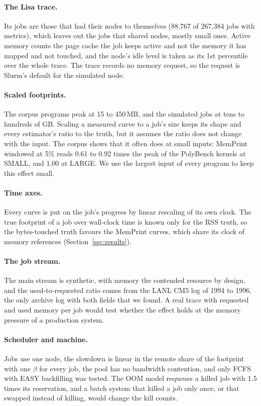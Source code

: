 \documentclass[11pt]{article}
\newcommand{\memprint}{MemPrint}
\newcommand{\secref}[1]{Section~\ref{#1}}
\begin{document}
\paragraph{The Lisa trace.} Its jobs are those that had their nodes to themselves (88{,}767 of 267{,}384 jobs with
metrics), which leaves out the jobs that shared nodes, mostly small ones. Active memory counts the page cache the
job keeps active and not the memory it has mapped and not touched, and the node's idle level is taken as its 1st
percentile over the whole trace. The trace records no memory request, so the request is Slurm's default for the
simulated node.

\paragraph{Scaled footprints.} The corpus programs peak at 15 to 450\,MB, and the simulated jobs at tens to
hundreds of GB. Scaling a measured curve to a job's size keeps its shape and every estimator's ratio to the
truth, but it assumes the ratio does not change with the input. The corpus shows that it often does at small
inputs: \memprint{} windowed at 5\% reads 0.61 to 0.92 times the peak of the PolyBench kernels at SMALL, and 1.00
at LARGE. We use the largest input of every program to keep this effect small.

\paragraph{Time axes.} Every curve is put on the job's progress by linear rescaling of its own clock. The true
footprint of a job over wall-clock time is known only for the RSS truth, so the bytes-touched truth favours the
\memprint{} curves, which share its clock of memory references (\secref{sec:results}).

\paragraph{The job stream.} The main stream is synthetic, with memory the contended resource by design, and the
used-to-requested ratio comes from the LANL CM5 log of 1994 to 1996, the only archive log with both fields that we
found. A real trace with requested and used memory per job would test whether the effect holds at the
memory pressure of a production system.

\paragraph{Scheduler and machine.} Jobs use one node, the slowdown is linear in the remote share of the
footprint with one $\beta$ for every job, the pool has no bandwidth contention, and only FCFS with EASY
backfilling was tested. The OOM model requeues a killed job with 1.5 times its reservation, and a batch system
that killed a job only once, or that swapped instead of killing, would change the kill counts.
\end{document}
